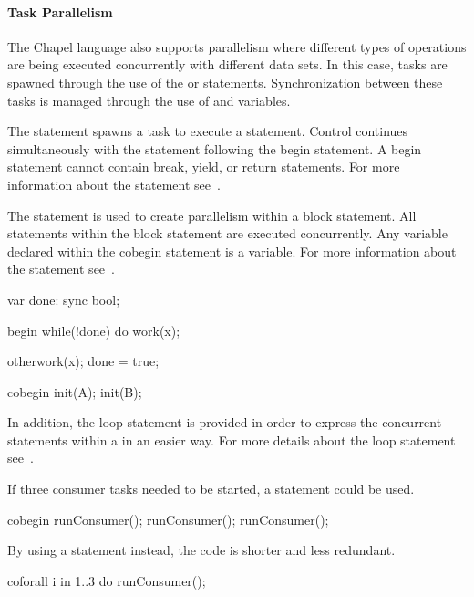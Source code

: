 \paragraph{Task Parallelism}
The Chapel language also supports parallelism where different types of
operations are being executed concurrently with different data sets.
In this case, tasks are spawned through the use of the 
or  statements.  Synchronization between these tasks is
managed through the use of  and  variables.

The  statement spawns a task to execute a
statement. Control continues simultaneously with the statement
following the begin statement.  A begin statement cannot contain
break, yield, or return statements.  For more information about
the  statement see~.

The  statement is used to create parallelism within
a block statement.  All statements within the block statement
are executed concurrently.  Any variable declared within the cobegin
statement is a  variable.  For more information about
the  statement see~.

\begin{example}
\begin{chapel}
var done: sync bool;
 
begin 
  while(!done) do work(x);

otherwork(x);
done = true;

cobegin {
  init(A);
  init(B);
}
\end{chapel}
\end{example}

In addition, the  loop statement is provided in order
to express the concurrent statements within a  in an
easier way.  For more details about the  loop statement
see~.

\begin{example}
If three consumer tasks needed to be started, a 
statement could be used.
\begin{chapel}
cobegin {
  runConsumer();
  runConsumer();
  runConsumer();
}
\end{chapel}

By using a  statement instead, the code is shorter
and less redundant.
\begin{chapel}
coforall i in 1..3 do
  runConsumer();
\end{chapel}
\end{example}

